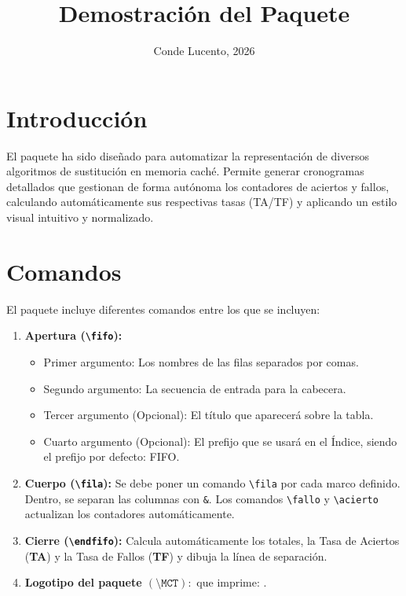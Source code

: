 \documentclass[11pt,a4paper]{article}
\title{Demostración del Paquete \MCT}
\author{Conde Lucento, 2026}
\date{ }
\begin{document}
\maketitle
\tableofcontents
\newpage

\section{Introducción}
El paquete \MCT{} ha sido diseñado para automatizar la representación de diversos algoritmos de sustitución en memoria caché. Permite generar cronogramas detallados que gestionan de forma autónoma los contadores de aciertos y fallos, calculando automáticamente sus respectivas tasas (TA/TF) y aplicando un estilo visual intuitivo y normalizado.

\section{Comandos}
El paquete incluye diferentes comandos entre los que se incluyen:
\begin{enumerate}
    \item \textbf{Apertura (\texttt{\textbackslash fifo}):} 
    \begin{itemize}
        \item Primer argumento: Los nombres de las filas separados por comas.
        \item Segundo argumento: La secuencia de entrada para la cabecera.
        \item Tercer argumento (Opcional): El título que aparecerá sobre la tabla.
        \item Cuarto argumento (Opcional): El prefijo que se usará en el Índice, siendo el prefijo por defecto: FIFO.
    \end{itemize}
    
    \item \textbf{Cuerpo (\texttt{\textbackslash fila}):} 
    Se debe poner un comando \texttt{\textbackslash fila} por cada marco definido. Dentro, se separan las columnas con \texttt{\&}. Los comandos \texttt{\textbackslash fallo} y \texttt{\textbackslash acierto} actualizan los contadores automáticamente.
    
    \item \textbf{Cierre (\texttt{\textbackslash endfifo}):} 
    Calcula automáticamente los totales, la Tasa de Aciertos (\textbf{TA}) y la Tasa de Fallos (\textbf{TF}) y dibuja la línea de separación.

    \item \textbf{Logotipo del paquete \((\texttt{\textbackslash MCT}):\)} que imprime: \MCT.
\end{enumerate}
\end{document}
